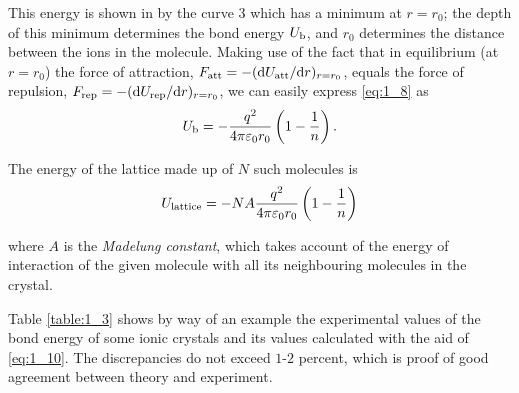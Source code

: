 This energy is shown in  by the curve $3$ which has a minimum at $r=r_0$; the depth of this minimum determines the bond energy $U_{\text{b}}$, and $r_0$ determines the distance between the ions in the molecule. Making use of the fact that in equilibrium (at $r=r_0$) the force of attraction, $F_{\text{att}}=-(\mathrm{d}U_{\text{att}}/\mathrm{d} r)_{r=r_0}$, equals the force of repulsion, $F_{\text{rep}}=-(\mathrm{d}U_{\text{rep}}/\mathrm{d} r)_{r=r_0}$, we can easily express \eqref{eq:1_8} as
\begin{equation}\label{eq:1_9}
	U_{\text{b}} = - \frac{q^2}{4\pi\varepsilon_0 r_0} \left(1 - \frac{1}{n}\right).
\end{equation}

The energy of the lattice made up of $N$ such molecules is
\begin{equation}\label{eq:1_10}
	U_{\text{lattice}} = - NA \frac{q^2}{4\pi\varepsilon_0 r_0} \left(1 - \frac{1}{n}\right)
\end{equation}

\noindent
where $A$ is the \textit{Madelung constant}, which takes account of the energy of interaction of the given molecule with all its neighbouring molecules in the crystal.

Table \ref{table:1_3} shows by way of an example the experimental values of the bond energy of some ionic crystals and its values calculated with the aid of \eqref{eq:1_10}. The discrepancies do not exceed $1$-$2$ percent, which is proof of good agreement between theory and experiment.

\begin{table}[!b]
	\renewcommand{\arraystretch}{1.2}
	\caption{}
	\vspace{-0.6cm}
	\label{table:1_3}
	\begin{center}\end{center}
\end{table}

